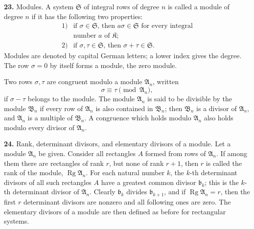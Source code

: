 \documentclass[11pt,a4paper]{article}
\newcommand{\K}{\mathfrak K}
\begin{document}
\textbf{23.} Modules. A system \(\mathfrak S\) of integral rows of degree \(n\) is called a module of degree \(n\) if it has the following two properties:
\[
\begin{array}{ll}
1)&\text{if \(\sigma\in\mathfrak S\), then \(a\sigma\in\mathfrak S\) for every integral}\\
&\text{number \(a\) of \(\K\);}\\[2mm]
2)&\text{if \(\sigma,\tau\in\mathfrak S\), then \(\sigma+\tau\in\mathfrak S\).}
\end{array}
\]
Modules are denoted by capital German letters; a lower index gives the degree. The row \(\sigma=0\) by itself forms a module, the zero module.

Two rows \(\sigma,\tau\) are congruent modulo a module \(\mathfrak A_n\), written
\[
 \sigma\equiv\tau\pmod{\mathfrak A_n},
\]
if \(\sigma-\tau\) belongs to the module. The module \(\mathfrak A_n\) is said to be divisible by the module \(\mathfrak B_n\) if every row of \(\mathfrak A_n\) is also contained in \(\mathfrak B_n\); then \(\mathfrak B_n\) is a divisor of \(\mathfrak A_n\), and \(\mathfrak A_n\) is a multiple of \(\mathfrak B_n\). A congruence which holds modulo \(\mathfrak A_n\) also holds modulo every divisor of \(\mathfrak A_n\).

\textbf{24.} Rank, determinant divisors, and elementary divisors of a module. Let a module \(\mathfrak A_n\) be given. Consider all rectangles \(A\) formed from rows of \(\mathfrak A_n\). If among them there are rectangles of rank \(r\), but none of rank \(r+1\), then \(r\) is called the rank of the module, \(\operatorname{Rg}\mathfrak A_n\). For each natural number \(k\), the \(k\)-th determinant divisors of all such rectangles \(A\) have a greatest common divisor \(\mathfrak b_k\); this is the \(k\)-th determinant divisor of \(\mathfrak A_n\). Clearly \(\mathfrak b_k\) divides \(\mathfrak b_{k+1}\), and if \(\operatorname{Rg}\mathfrak A_n=r\), then the first \(r\) determinant divisors are nonzero and all following ones are zero. The elementary divisors of a module are then defined as before for rectangular systems.
\end{document}
